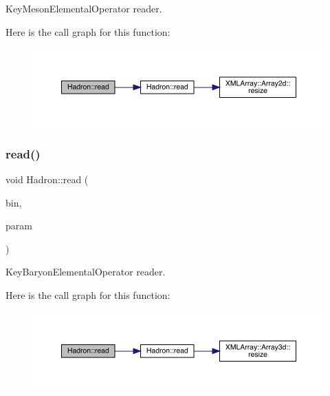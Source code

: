 Key\+Meson\+Elemental\+Operator reader. 

Here is the call graph for this function\+:\nopagebreak
\begin{figure}[H]
\begin{center}
\leavevmode
\includegraphics[width=350pt]{d1/daf/namespaceHadron_ae6acb258c409e20fdd2a36b3266138bc_cgraph}
\end{center}
\end{figure}
\mbox{\label{namespaceHadron_afb941d679afa3b1d65ca3048b28bc78c}} 
\subsubsection{\texorpdfstring{read()}{read()}\hspace{0.1cm}{\footnotesize\ttfamily [43/94]}}
{\footnotesize\ttfamily void Hadron\+::read (\begin{DoxyParamCaption}\item[{\mbox{\hyperlink{classADATIO_1_1BinaryReader}{Binary\+Reader}} \&}]{bin,  }\item[{\mbox{\hyperlink{structHadron_1_1KeyBaryonElementalOperator__t}{Key\+Baryon\+Elemental\+Operator\+\_\+t}} \&}]{param }\end{DoxyParamCaption})}



Key\+Baryon\+Elemental\+Operator reader. 

Here is the call graph for this function\+:\nopagebreak
\begin{figure}[H]
\begin{center}
\leavevmode
\includegraphics[width=350pt]{d1/daf/namespaceHadron_afb941d679afa3b1d65ca3048b28bc78c_cgraph}
\end{center}
\end{figure}
\mbox{\label{namespaceHadron_a61a08fc66a0ee31593a2d5fff5657f7c}} 
